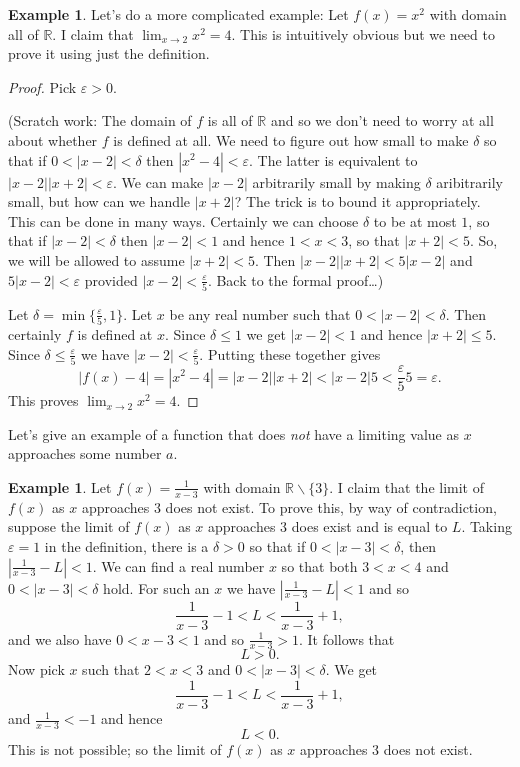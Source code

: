 \documentclass[12pt]{amsart}
\def\d{\delta}
\def\e{\varepsilon}
\newcommand{\R}{{\mathbb{R}}}
\numberwithin{equation}{section}
\theoremstyle{plain} %
\theoremstyle{definition}
\newtheorem{ex}[equation]{Example}
\theoremstyle{remark}
\begin{document}
\begin{ex} Let's do a more complicated example: Let $f(x) = x^2$ with  domain all of $\R$. I claim that $\lim_{x \to 2} x^2 = 4$. This is intuitively
  obvious but we need to prove it using just the definition.

\begin{proof}
  Pick $\e > 0$.

  (Scratch work: The domain of $f$ is all of $\R$ and so we don't need to worry at all about whether $f$ is defined at all.
  We need to figure out how small to make $\d$ so that if $0 < |x-2| < \d$ then $|x^2 - 4| < \e$. The latter
is equivalent to $|x-2||x+2| < \e$. We can make $|x-2|$ arbitrarily small by making $\d$
aribitrarily small, but how can we handle $|x+2|$? The trick is to bound it appropriately. This can be done in many ways. Certainly we can choose $\d$ to
be at most $1$, so that if $|x-2| < \d$ then $|x-2| < 1$ and hence $1 < x < 3$, so that $|x+2| < 5$. So, we will be allowed to assume $|x+2| < 5$. Then
$|x-2||x+2| < 5 |x-2|$ and $5 |x-2| < \e$ provided $|x-2| < \frac{\e}{5}$. Back to the formal proof\dots)

Let $\d = \min\{\frac{\e}{5}, 1\}$. Let $x$ be any real number such that  ${0 < |x-2| < \d}$. Then certainly $f$ is defined at $x$. 
Since $\d \leq 1$ we get $|x-2| < 1$ and hence $|x+2| \leq
5$. Since $\d \leq \frac{\e}{5}$ we have  $|x-2|  < \frac{\e}{5}$. Putting these together gives
$$
|f(x) - 4| = |x^2 - 4| = |x-2||x+2| < |x-2| 5 < \frac{\e}{5} 5 = \e.
$$
This proves $\lim_{x \to 2} x^2 = 4$. 
\end{proof}
\end{ex}


Let's give an example of a function that does {\em not} have a limiting value as $x$ approaches some number $a$. 

\begin{ex} Let  $f(x)   = \frac{1}{x-3}$ with domain $\R \smallsetminus \{3\}$. I claim that the limit of $f(x)$ as $x$ approaches $3$ does not exist. To prove this, by way of
contradiction, suppose the limit of $f(x)$ as $x$ approaches $3$ does exist and is equal to $L$. Taking $\e = 1$ in the definition, there is a $\d > 0$ so that if
$0 < |x-3| < \d$, then $\left|\frac{1}{x-3} - L\right| < 1$. We can find a real number  $x$ so that both $3 < x < 4$ and $0 < |x-3| < \d$ hold. For such
an  $x$ we have 
$\left|\frac{1}{x-3} - L\right| < 1$ and so 
$$
\frac{1}{x-3} - 1 <  L < \frac{1}{x-3} + 1,
$$
and we also have 
$0 < x-3 < 1$ and so 
$\frac{1}{x-3} > 1$. It follows that
$$
L > 0.
$$
Now pick $x$ such that $2 < x < 3$ and $0 < |x-3| < \d$.  We get
$$
\frac{1}{x-3} - 1 <  L < \frac{1}{x-3} + 1,
$$
and $\frac{1}{x-3} < -1$ and hence
$$
L < 0.
$$
This is not possible; so the limit of $f(x)$ as $x$ approaches $3$ does not exist. 
\end{ex}
\end{document}
